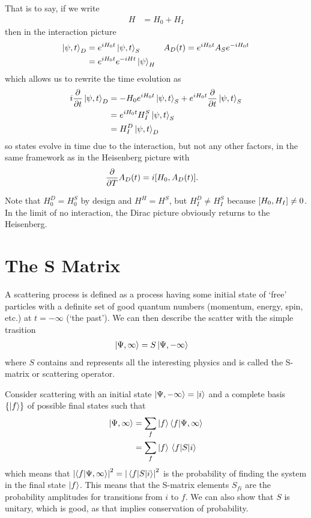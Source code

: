 \documentclass[notes.tex]{subfiles}
\begin{document}
That is to say, if we write
\begin{align*}
	H & = H_0 + H_I
\end{align*}
then in the interaction picture
\begin{align*}
	\ket{\psi, t}_D & = e^{iH_0 t}\ket{\psi, t}_S      & A_D(t) & = e^{iH_0t}A_Se^{-iH_0t} \\
	                & = e^{iH_0t} e^{-iHt}\ket{\psi}_H
\end{align*}
which allows us to rewrite the time evolution as
\begin{align*}
	i\pdv{t}\ket{\psi, t}_D & = -H_0e^{iH_0t}\ket{\psi, t}_S + e^{iH_0t}\pdv{t}\ket{\psi, t}_S \\
	                        & = e^{iH_0t}H_I^S\ket{\psi, t}_S                                  \\
	                        & = H_I^D\ket{\psi,t}_D
\end{align*}
so states evolve in time due to the interaction, but not any other factors, in the same framework as in the Heisenberg picture with
\begin{align*}
	\pdv{T}A_D(t) & = i\commutator{H_0}{A_D(t)}.
\end{align*}

Note that \(H_0^D = H_0^S\) by design and $H^H = H^S$, but $H^D_I \neq H^S_I$ because $\commutator{H_0}{H_I}\neq 0$. In the limit of no interaction, the Dirac picture obviously returns to the Heisenberg.

\section{The S Matrix}
A scattering process is defined as a process having some initial state of `free' particles with a definite set of good quantum numbers (momentum, energy, spin, etc.) at $t=-\infty$ (`the past').
We can then describe the scatter with the simple trasition
\begin{align*}
	\ket{\Psi, \infty} & = S\ket{\Psi, -\infty}
\end{align*}
where $S$ contains and represents all the interesting physics and is called the S-matrix or scattering operator.

Consider scattering with an initial state $\ket{\Psi, -\infty} = \ket{i}$ and a complete basis $\{\ket{f}\}$ of possible final states such that
\begin{align*}
	\ket{\Psi, \infty} & = \sum_f \ket{f}\braket{f}{\Psi, \infty} \\
	                   & = \sum_f \ket{f} \mel{f}{S}{i}
\end{align*}
which means that \(
\abs{\braket{f}{\Psi, \infty}}^2 = \abs{\mel{f}{S}{i}}^2
\)
is the probability of finding the system in the final state $\ket{f}$.
This means that the S-matrix elements $S_{fi}$ are the probability amplitudes for transitions from $i$ to $f$. We can also show that $S$ is unitary, which is good, as that implies conservation of probability.
\end{document}
